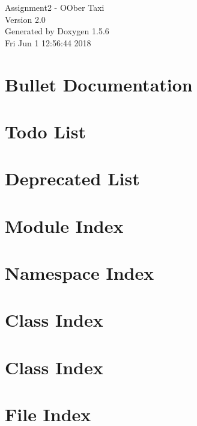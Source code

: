\documentclass[a4paper]{book}
\begin{document}
\begin{titlepage}
\vspace*{7cm}
\begin{center}
{\Large Assignment2 - OOber Taxi \\[1ex]\large Version 2.0 }\\
\vspace*{1cm}
{\large Generated by Doxygen 1.5.6}\\
\vspace*{0.5cm}
{\small Fri Jun 1 12:56:44 2018}\\
\end{center}
\end{titlepage}
\clearemptydoublepage
{}
\tableofcontents
\clearemptydoublepage
{}
\chapter{Bullet Documentation}
\label{index}\hypertarget{index}{}
\chapter{Todo List}
\label{todo}
\hypertarget{todo}{}

\chapter{Deprecated List}
\label{deprecated}
\hypertarget{deprecated}{}

\chapter{Module Index}

\chapter{Namespace Index}

\chapter{Class Index}

\chapter{Class Index}

\chapter{File Index}

\end{document}
